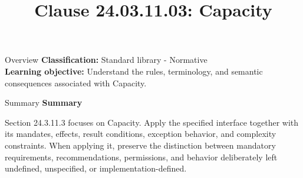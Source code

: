 \documentclass[10pt,letterpaper]{article}
\title{Clause 24.03.11.03: Capacity}
\author{}
\date{}
\begin{document}
\maketitle
\begin{CornellOverviewBox}{Overview}
\textbf{Classification:} Standard library - Normative\\[2pt]
\textbf{Learning objective:} Understand the rules, terminology, and semantic consequences associated with Capacity.
\end{CornellOverviewBox}\begin{CornellSummaryBox}{Summary}
{\sffamily\bfseries\color{Accent} Summary}\par\vspace{3pt}Section 24.3.11.3 focuses on Capacity. Apply the specified interface together with its mandates, effects, result conditions, exception behavior, and complexity constraints. When applying it, preserve the distinction between mandatory requirements, recommendations, permissions, and behavior deliberately left undefined, unspecified, or implementation-defined.
\end{CornellSummaryBox}
\end{document}
